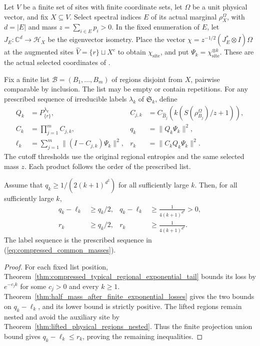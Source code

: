 Let $V$ be a finite set of sites with finite coordinate sets, let
$\Omega$ be a unit physical vector, and fix $X\subseteq V$.
Select spectral indices $E$ of its actual marginal $\rho_X^\Omega$,
with $d=|E|$ and mass $z=\sum_{i\in E}p_i>0$. In the fixed enumeration
of $E$, let $J_E:\mathbb C^d\to\mathcal H_X$ be the eigenvector isometry.
Place the vector $\chi=z^{-1/2}(J_E^*\otimes I)\Omega$ at the augmented
sites $\widehat V=\{r\}\sqcup X^c$ to obtain $\chi_{\mathrm{site}}$,
and put $\Psi_k=\chi_{\mathrm{site}}^{\otimes k}$.
These are the actual selected coordinates of
\cite[Section~7, lines~240--247 and 332--354]{OpenAI2026AreaLaw}.

Fix a finite list $\mathcal B=(B_1,\ldots,B_m)$ of regions disjoint from
$X$, pairwise comparable by inclusion. The list may be empty or contain
repetitions. For any prescribed sequence of irreducible labels $\lambda_k$
of $\mathfrak S_k$, define
\begin{align}
 Q_k&=P_{\{r\}}^{\lambda_k},
 &C_{j,k}&=C_{\widehat B_j}\!\left(k\left(S(\rho_{B_j}^\Omega)/z+1\right)\right),\\
 C_k&=\prod_{j=1}^m C_{j,k},
 &q_k&=\|Q_k\Psi_k\|^2,\\
 \ell_k&=\sum_{j=1}^m\|(I-C_{j,k})\Psi_k\|^2,
 &r_k&=\|C_kQ_k\Psi_k\|^2.
 \label{eq:compressed_common_masses}
\end{align}
The cutoff thresholds use the original regional entropies and the same
selected mass $z$. Each product follows the order of the prescribed list.

\begin{theorem}
\label{thm:compressed_typical_common_retained_mass}
\leanok
{}
Assume that $q_k\ge 1/(2(k+1)^{d^2})$ for all sufficiently large $k$.
Then, for all sufficiently large $k$,
\begin{align}
 q_k-\ell_k&\ge q_k/2,
 &q_k-\ell_k&\ge\frac{1}{4(k+1)^{d^2}}>0,\\
 r_k&\ge q_k/2,
 &r_k&\ge\frac{1}{4(k+1)^{d^2}}.
\end{align}
The label sequence is the prescribed sequence in
(\ref{eq:compressed_common_masses}).
\end{theorem}
\begin{proof}\leanok
For each fixed list position, Theorem~\ref{thm:compressed_typical_regional_exponential_tail}
bounds its loss by $e^{-c_jk}$ for some $c_j>0$ and every $k\ge1$.
Theorem~\ref{thm:half_mass_after_finite_exponential_losses} gives the two
bounds on $q_k-\ell_k$, and its lower bound is strictly positive.
The lifted regions remain nested and avoid the auxiliary site by
Theorem~\ref{thm:lifted_physical_regions_nested}. Thus the finite projection
union bound gives $q_k-\ell_k\le r_k$, proving the remaining inequalities.
\end{proof}

